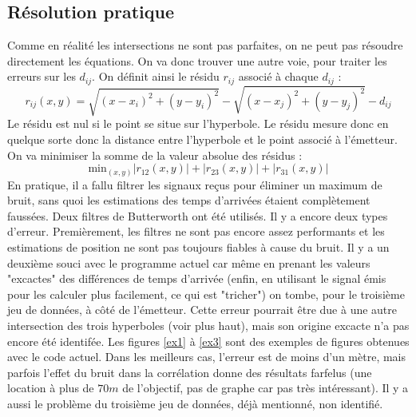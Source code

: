 \documentclass[10pt,a4paper]{article}
\begin{document}
\subsection{Résolution pratique}
Comme en réalité les intersections ne sont pas parfaites, on ne peut pas résoudre directement les équations. On va donc trouver une autre voie, pour traiter les erreurs sur les $d_{ij}$.
On définit ainsi le résidu $r_{ij}$ associé à chaque $d_{ij}$ :
\begin{equation}
r_{ij}(x,y) = \sqrt{(x-x_i)^2 + (y-y_i)^2} - \sqrt{(x-x_j)^2 + (y-y_j)^2} - d_{ij}
\end{equation}
Le résidu est nul si le point se situe sur l'hyperbole. Le résidu mesure donc en quelque sorte donc la distance entre l'hyperbole et le point associé à l'émetteur. On va minimiser la somme de la valeur absolue des résidus :
\begin{equation}
\mathrm{min}_{(x,y)} | r_{12}(x,y)| + |r_{23} (x,y)| + |r_{31} (x,y)|
\end{equation}
En pratique, il a fallu filtrer les signaux reçus pour éliminer un maximum de bruit, sans quoi les estimations des temps d'arrivées étaient complètement faussées. Deux filtres de Butterworth ont été utilisés.
Il y a encore deux types d'erreur. Premièrement, les filtres ne sont pas encore assez performants et les estimations de position ne sont pas toujours fiables à cause du bruit. Il y a un deuxième souci avec le programme actuel car même en prenant les valeurs "excactes" des différences de temps d'arrivée (enfin, en utilisant le signal émis pour les calculer plus facilement, ce qui est "tricher") on tombe, pour le troisième jeu de données, à côté de l'émetteur. Cette erreur pourrait être due à une autre intersection des trois hyperboles (voir plus haut), mais son origine excacte n'a pas encore été identifée.
Les figures \ref{ex1} à \ref{ex3} sont des exemples de figures obtenues avec le code actuel. Dans les meilleurs cas, l'erreur est de moins d'un mètre, mais parfois l'effet du bruit dans la corrélation donne des résultats farfelus (une location à plus de $70m$ de l'objectif, pas de graphe car pas très intéressant). Il y a aussi le problème du troisième jeu de données, déjà mentionné, non identifié.
\end{document}
